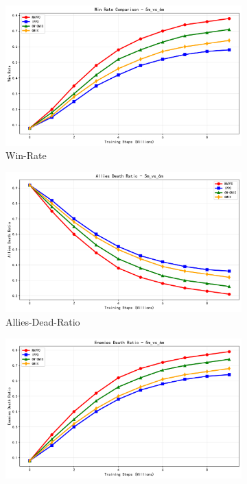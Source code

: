 \begin{figure}[ht!]
    \centering
    \begin{subfigure}[b]{0.32\textwidth}
        \centering
        \includegraphics[width=\textwidth]{figures/win_rate_5m_vs_6m.png}
        \caption{Win-Rate}
        \label{fig:win_rate_5m}
    \end{subfigure}
    \hfill
    \begin{subfigure}[b]{0.32\textwidth}
        \centering
        \includegraphics[width=\textwidth]{figures/allies_death_ratio_5m_vs_6m.png}
        \caption{Allies-Dead-Ratio}
        \label{fig:allies_dead_5m}
    \end{subfigure}
    \hfill
    \begin{subfigure}[b]{0.32\textwidth}
        \centering
        \includegraphics[width=\textwidth]{figures/enemies_death_ratio_5m_vs_6m.png}

\end{subfigure}
\end{figure}
